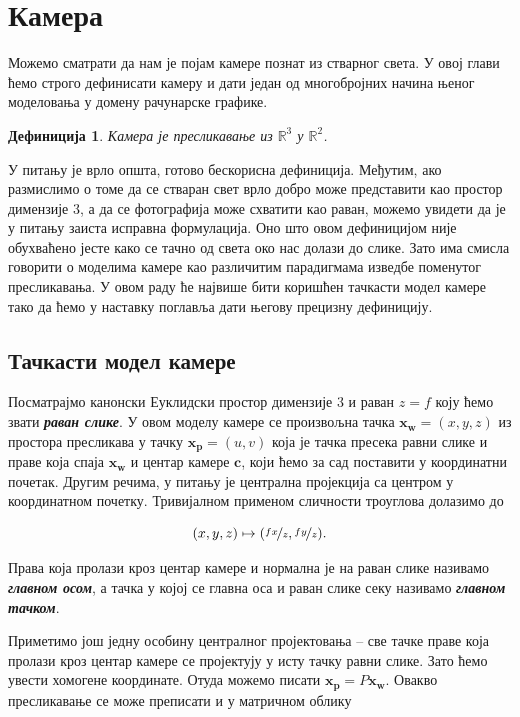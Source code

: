 \documentclass[12pt, a4paper, twoside]{book}
\numberwithin{equation}{chapter}
\numberwithin{theorem}{section}
\newtheorem{definition}{Дефиниција}
\numberwithin{definition}{section}
\numberwithin{definitionChapter}{chapter}
\begin{document}
\section{Камера}
Можемо сматрати да нам је појам камере познат из стварног света. У овој глави
ћемо строго дефинисати камеру и дати један од многобројних начина њеног
моделовања у домену рачунарске графике.

\begin{definition}
	Камера је пресликавање из $\mathbb{R}^3$ у $\mathbb{R}^2$.
\end{definition}

У питању је врло општа, готово бескорисна дефиниција. Међутим, ако размислимо
о томе да се стваран свет врло добро може представити као простор димензије $3$,
а да се фотографија може схватити као раван, можемо увидети да је у питању заиста
исправна формулација. Оно што овом дефиницијом није обухваћено јесте како се тачно
од света око нас долази до слике. Зато има смисла говорити о моделима камере као
различитим парадигмама изведбе поменутог пресликавања. У овом раду ће највише
бити коришћен тачкасти модел камере тако да ћемо у наставку поглавља дати његову
прецизну дефиницију.
	
	\subsection{Тачкасти модел камере}
	Посматрајмо канонски Еуклидски простор димензије $3$ и раван $z=f$ коју ћемо звати
	\textbf{\textit{раван слике}}. У овом моделу камере се произвољна тачка $\mathbf{x_w}=(x, y, z)$ из простора
	пресликава у тачку $\mathbf{x_p}=(u,v)$ која је тачка пресека равни слике и праве која спаја $\mathbf{x_w}$
	и центар камере $\mathbf{c}$, који ћемо за сад поставити у координатни почетак.	Другим речима, у питању је централна
	пројекција са центром у координатном почетку. Тривијалном применом сличности троуглова долазимо до
	
	\begin{equation}
		(x, y, z) \mapsto (\nicefrac{fx}{z}, \nicefrac{fy}{z}).
	\end{equation}

	Права која пролази кроз центар камере и нормална је на раван слике називамо \textbf{\textit{главном осом}},
	а тачка у којој се главна оса и раван слике секу називамо \textbf{\textit{главном тачком}}.
	
	Приметимо још једну особину централног пројектовања -- све тачке праве која пролази кроз центар
	камере се пројектују у исту тачку равни слике. Зато ћемо увести хомогене координате. Отуда
	можемо писати $\mathbf{x_p} = P\mathbf{x_w}$. Овакво пресликавање се може преписати и у
	матричном облику
	
\end{document}
